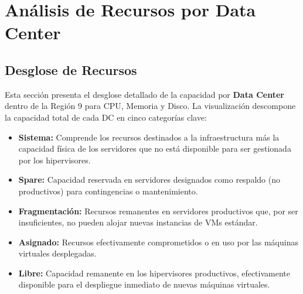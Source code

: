 \documentclass[11pt,a4paper]{article}
\begin{document}
\begin{table}[H]
\centering
\caption{Almacenamiento Compartido (NAS) por Data Center}
\label{tab:nas_storage}
\end{table}




\section{Análisis de Recursos por Data Center}


\subsection{Desglose de Recursos}

Esta sección presenta el desglose detallado de la capacidad por \textbf{Data Center} dentro de la Región 9 para CPU, Memoria y Disco. La visualización descompone la capacidad total de cada DC en cinco categorías clave:

\begin{itemize}
    \setlength\itemsep{0em}
    \item \textbf{Sistema:} Comprende los recursos destinados a la infraestructura más la capacidad física de los servidores que no está disponible para ser gestionada por los hipervisores.
    \item \textbf{Spare:} Capacidad reservada en servidores designados como respaldo (no productivos) para contingencias o mantenimiento.
    \item \textbf{Fragmentación:} Recursos remanentes en servidores productivos que, por ser insuficientes, no pueden alojar nuevas instancias de VMs estándar.
    \item \textbf{Asignado:} Recursos efectivamente comprometidos o en uso por las máquinas virtuales desplegadas.
    \item \textbf{Libre:} Capacidad remanente en los hipervisores productivos, efectivamente disponible para el despliegue inmediato de nuevas máquinas virtuales.
\end{itemize}
\end{document}

